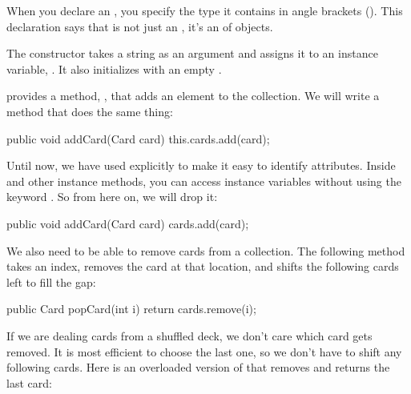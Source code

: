 
When you declare an , you specify the type it contains in angle brackets (\java{<>}).
This declaration says that  is not just an , it's an  of  objects.



The constructor takes a string as an argument and assigns it to an instance variable, .
It also initializes  with an empty .

 provides a method, , that adds an element to the collection.
We will write a  method that does the same thing:

\begin{code}
public void addCard(Card card) {
    this.cards.add(card);
}
\end{code}


Until now, we have used  explicitly to make it easy to identify attributes.
Inside  and other instance methods, you can access instance variables without using the keyword .
So from here on, we will drop it:

\begin{code}
public void addCard(Card card) {
    cards.add(card);
}
\end{code}

We also need to be able to remove cards from a collection.
The following method takes an index, removes the card at that location, and shifts the following cards left to fill the gap:

\begin{code}
public Card popCard(int i) {
    return cards.remove(i);
}
\end{code}


If we are dealing cards from a shuffled deck, we don't care which card gets removed.
It is most efficient to choose the last one, so we don't have to shift any following cards.
Here is an overloaded version of  that removes and returns the last card:

